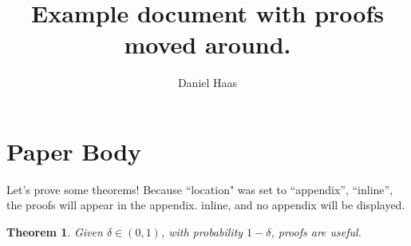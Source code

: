 \documentclass{article}
\title{Example document with proofs moved around.}
\author{Daniel Haas}
\newtheorem{theorem}{Theorem}
\begin{document}
\maketitle

\section{Paper Body}
Let's prove some theorems! Because ``location" was set to \ifmoveproofstoappendix ``appendix'', \else ``inline'', \fi the proofs will appear \ifmoveproofstoappendix in the appendix. \else inline, and no appendix will be displayed. \fi

\begin{theorem}\label{theorem_one}
Given $\delta \in (0, 1)$, with probability $1 - \delta$, proofs are useful.
\end{theorem}


\appendix
{}
\end{document}
